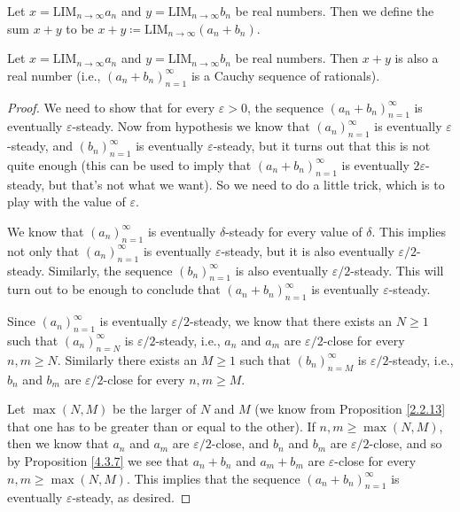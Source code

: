 \begin{definition}\label{5.3.4}
    Let \(x = \text{LIM}_{n \to \infty} a_n\) and \(y = \text{LIM}_{n \to \infty} b_n\) be real numbers.
    Then we define the sum \(x + y\) to be \(x + y \coloneqq \text{LIM}_{n \to \infty} (a_n + b_n)\).
\end{definition}

\setcounter{theorem}{5}
\begin{lemma}\label{5.3.6}
    Let \(x = \text{LIM}_{n \to \infty} a_n\) and \(y = \text{LIM}_{n \to \infty} b_n\) be real numbers.
    Then \(x + y\) is also a real number
    (i.e., \((a_n + b_n)_{n = 1}^{\infty}\) is a Cauchy sequence of rationals).
\end{lemma}

\begin{proof}
    We need to show that for every \(\varepsilon > 0\), the sequence \((a_n + b_n)_{n = 1}^{\infty}\) is eventually \(\varepsilon\)-steady.
    Now from hypothesis we know that \((a_n)_{n = 1}^{\infty}\) is eventually \(\varepsilon\)-steady, and \((b_n)_{n = 1}^{\infty}\) is eventually \(\varepsilon\)-steady, but it turns out that this is not quite enough
    (this can be used to imply that \((a_n + b_n)_{n = 1}^{\infty}\) is eventually \(2\varepsilon\)-steady, but that's not what we want).
    So we need to do a little trick, which is to play with the value of \(\varepsilon\).

    We know that \((a_n)_{n = 1}^{\infty}\) is eventually \(\delta\)-steady for every value of \(\delta\).
    This implies not only that \((a_n)_{n = 1}^{\infty}\) is eventually \(\varepsilon\)-steady, but it is also eventually \(\varepsilon / 2\)-steady.
    Similarly, the sequence \((b_n)_{n = 1}^{\infty}\) is also eventually \(\varepsilon / 2\)-steady.
    This will turn out to be enough to conclude that \((a_n + b_n)_{n = 1}^{\infty}\) is eventually \(\varepsilon\)-steady.

    Since \((a_n)_{n = 1}^{\infty}\) is eventually \(\varepsilon / 2\)-steady, we know that there exists an \(N \geq 1\) such that \((a_n)_{n = N}^{\infty}\) is \(\varepsilon / 2\)-steady, i.e., \(a_n\) and \(a_m\) are \(\varepsilon / 2\)-close for every \(n, m \geq N\).
    Similarly there exists an \(M \geq 1\) such that \((b_n)_{n = M}^{\infty}\) is \(\varepsilon / 2\)-steady, i.e., \(b_n\) and \(b_m\) are \(\varepsilon / 2\)-close for every \(n, m \geq M\).

    Let \(\max(N, M)\) be the larger of \(N\) and \(M\)
    (we know from Proposition \ref{2.2.13} that one has to be greater than or equal to the other).
    If \(n, m \geq \max(N, M)\), then we know that \(a_n\) and \(a_m\) are \(\varepsilon / 2\)-close, and \(b_n\) and \(b_m\) are \(\varepsilon / 2\)-close, and so by Proposition \ref{4.3.7} we see that \(a_n + b_n\) and \(a_m + b_m\) are \(\varepsilon\)-close for every \(n, m \geq \max(N, M)\).
    This implies that the sequence \((a_n + b_n)_{n = 1}^{\infty}\) is eventually \(\varepsilon\)-steady, as desired.
\end{proof}

